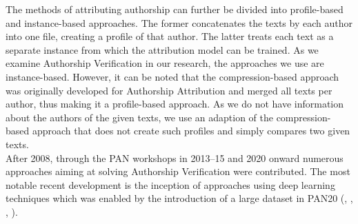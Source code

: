 The methods of attributing authorship can further be divided into profile-based and instance-based approaches.
The former concatenates the texts by each author into one file, creating a profile of that author.
The latter treats each text as a separate instance from which the attribution model can be trained.
As we examine Authorship Verification in our research, the approaches we use are instance-based.
However, it can be noted that the compression-based approach was originally developed for Authorship Attribution and merged all texts per author, thus making it a profile-based approach.
As we do not have information about the authors of the given texts, we use an adaption of the compression-based approach that does not create such profiles and simply compares two given texts.\\
After 2008, through the PAN workshops in 2013--15 and 2020 onward numerous approaches aiming at solving Authorship Verification were contributed.
The most notable recent development is the inception of approaches using deep learning techniques which was enabled by the introduction of a large dataset in PAN20 (\cite{boenninghoff2020deep}, \cite{weerasinghe2020feature}, \cite{araujo2020siamese}, \cite{ordonez2020will}).\\

